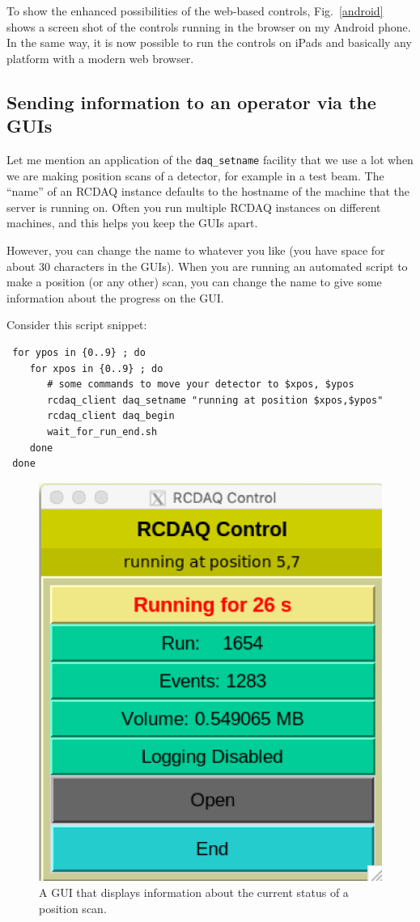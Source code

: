 \documentclass{article}[11pt]
\begin{document}
To show the enhanced possibilities of the web-based controls,
Fig.~\ref{android} shows a screen shot of the controls running in the
browser on my Android phone. In the same way, it is now possible to
run the controls on iPads and basically any platform with a modern web
browser.

\subsection{Sending information to an operator via the GUIs}

Let me mention an application of the \verb|daq_setname| facility that
we use a lot when we are making position scans of a detector, for
example in a test beam. The ``name'' of an RCDAQ instance defaults to
the hostname of the machine that the server is running on. Often you
run multiple RCDAQ instances on different machines, and this helps you
keep the GUIs apart.

However, you can change the name to whatever you like (you have space
for about 30 characters in the GUIs). When you are running an
automated script to make a position (or any other) scan, you can
change the name to give some information about the progress on the GUI.

Consider this script snippet:

\begin{verbatim}
 for ypos in {0..9} ; do
    for xpos in {0..9} ; do
       # some commands to move your detector to $xpos, $ypos
       rcdaq_client daq_setname "running at position $xpos,$ypos"
       rcdaq_client daq_begin
       wait_for_run_end.sh
    done
 done
\end{verbatim}


\begin{figure}[htb]
  \begin{center}
    \includegraphics[width=0.45\columnwidth]{GUI_name.png} 
  \end{center}
  \caption{\label{GUIname}A GUI that displays information about the
    current status of a position scan.}
\end{figure}
\end{document}
